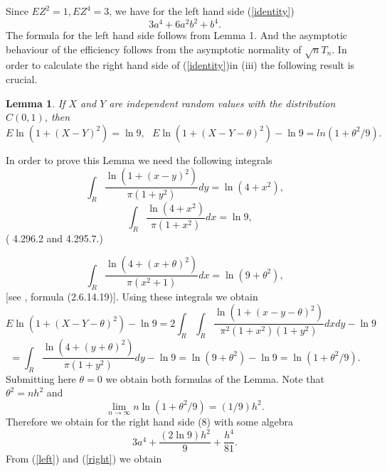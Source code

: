 \documentclass[final,11pt,3p]{elsarticle}
\newtheorem{lemma}{Lemma}
\begin{document}
Since $E Z^2=1, EZ^4=3$,  we have for the left hand side (\ref{identity})
\begin{equation}\label{left}
3a^4 + 6a^2b^2 + b^4.
 \end{equation}
 The formula for the left hand side follows from Lemma 1.
 And the asymptotic behaviour of the efficiency follows from the asymptotic normality of $\sqrt nT_n$. 
In order to calculate the right hand side of  (\ref{identity})in (iii)
 the following result is crucial.
\begin{lemma}If $X$ and $Y$ are independent random values with the distribution
$C(0,1)$, then
\begin{equation}
 E \ln(1+ (X- Y)^2)= \ln 9,\,\,\,\,
 E \ln(1+ (X- Y - \theta)^2)-\ln 9
 =
ln(1+ \theta^2/9).
\end{equation}
\end{lemma}
In order to prove this Lemma we need the following integrals
\begin{equation}
\label{i1}
\int_{R}
\frac {\ln(1+(x-y)^2)}{\pi(1+y^2)} dy = \ln(4+x^2),
\end{equation}
\begin{equation}
\label{i2}
\quad \int_{R} \frac {\ln(4+x^2)}{\pi(1+x^2)} dx = \ln 9,
\end{equation}
(\cite{GradRyzh2007}  4.296.2 and 4.295.7.)

\begin{equation}
\label{i3}
\int_{R} \frac{\ln(4 +(x +\theta)^2 )}{\pi(x^2 +1)} dx = \ln(9+\theta^2),
\end{equation}
[see  \cite{PrudBrychMarich1981}, formula (2.6.14.19)].
Using these integrals we obtain
\begin{equation}
 E \ln(1+ (X- Y - \theta)^2)-\ln 9  = 2\int_{R} \int_{R} \frac{\ln(1+(x-y-\theta)^2)}{\pi^2(1+x^2)(1+y^2)} dx dy -\ln 9
\end{equation}
\begin{equation}
= \int_{R}\frac{\ln(4 +(y+\theta)^2)}{\pi(1+y^2)} dy- \ln 9= \ln(9+\theta^2) -\ln 9 = \ln(1+ \theta^2/9).
\end{equation}
Submitting here  $\theta=0$ we obtain both formulas of the Lemma.
Note that $\theta^2=nh^2$ and
$$
\lim_{n\to \infty} n \ln(1+ \theta^2/9)= (1/9)h^2.
$$
Therefore we obtain for the right hand side (8) with some algebra
\begin{equation}\label{right}
3a^4 + \frac{(2\ln 9 )h^2}{9} + \frac{h^4}{81}.
 \end{equation}
 From (\ref{left}) and  (\ref{right}) we obtain
\end{document}
